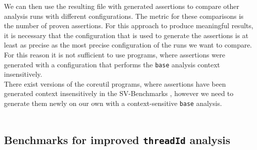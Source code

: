       We can then use the resulting file with generated assertions to compare other analysis runs with different configurations. The metric for these comparisons is the number of proven assertions. For this approach to produce meaningful results, it is necessary that the configuration that is used to generate the assertions is at least as precise as the most precise configuration of the runs we want to compare. For this reason it is not sufficient to use programs, where assertions were generated with a configuration that performs the \texttt{base} analysis context insensitively.\\
      There exist versions of the coreutil programs, where assertions have been generated context insensitively in the SV-Benchmarks \parencite{svBench}, however we need to generate them newly on our own with a context-sensitive \texttt{base} analysis.\\
      \\

    
    \subsection{Benchmarks for improved \texttt{threadId} analysis}

